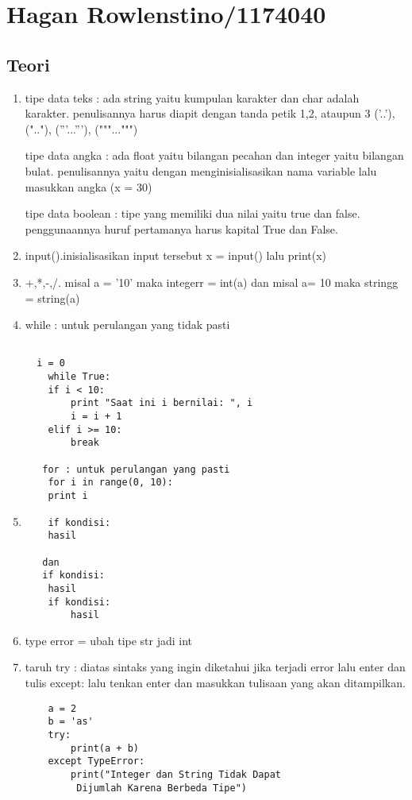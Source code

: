\section{Hagan Rowlenstino/1174040}
\subsection{Teori}
\begin{enumerate}
	\item tipe data teks : ada string yaitu kumpulan karakter dan char adalah karakter. penulisannya harus diapit dengan tanda petik 1,2, ataupun 3
   ('..'), (".."), ('''...'''), ("""...""")

   tipe data angka : ada float yaitu bilangan pecahan dan integer yaitu bilangan bulat. penulisannya yaitu dengan menginisialisasikan nama
   variable lalu masukkan angka (x = 30)

   tipe data boolean : tipe yang memiliki dua nilai yaitu true dan false. penggunaannya huruf pertamanya harus kapital True dan False.

   \item input().inisialisasikan input tersebut x = input() lalu print(x)

   \item +,*,-,/. misal a = '10' maka integerr = int(a) dan misal a= 10 maka stringg = string(a)

   \item while : untuk perulangan yang tidak pasti

   \begin{verbatim}

  i = 0
	while True:
    if i < 10:
        print "Saat ini i bernilai: ", i
        i = i + 1
    elif i >= 10:
        break
   
   for : untuk perulangan yang pasti
	for i in range(0, 10):
    print i
    \end{verbatim}
    \item 
    \begin{verbatim}
    if kondisi:
	hasil

   dan
   if kondisi:
	hasil
	if kondisi:
	    hasil
	\end{verbatim}
	\item type error = ubah tipe str jadi int

	\item taruh try : diatas sintaks yang ingin diketahui jika terjadi error lalu enter dan tulis except: lalu tenkan enter 
dan masukkan tulisaan yang akan ditampilkan.
	\begin{verbatim}
	a = 2
	b = 'as'
	try:
    	print(a + b)
	except TypeError:
    	print("Integer dan String Tidak Dapat
    	 Dijumlah Karena Berbeda Tipe")
	\end{verbatim}

\end{enumerate}
